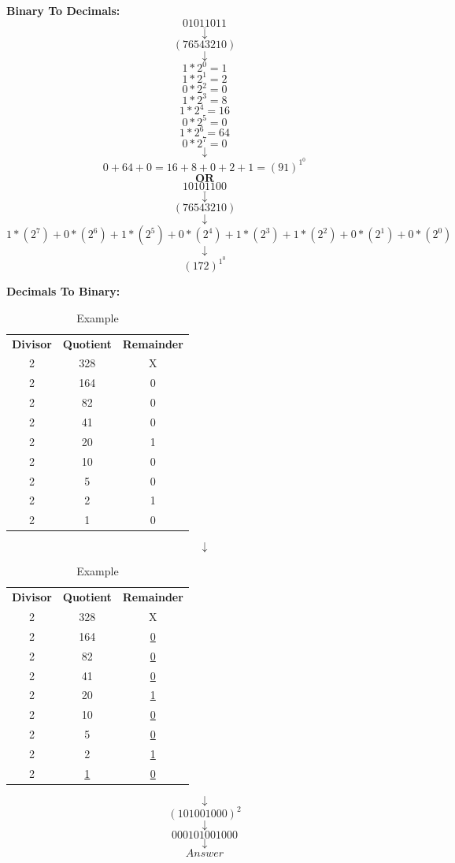 \documentclass{article}
\begin{document}
\newpage

\textbf{Binary To Decimals:}
\newline
$$\underline{01011011}$$
$$\downarrow$$
$$(76543210)$$
$$\downarrow$$
$$1*2^0=1$$
$$1*2^1=2$$
$$0*2^2=0$$
$$1*2^3=8$$
$$1*2^4=16$$
$$0*2^5=0$$
$$1*2^6=64$$
$$0*2^7=0$$
$$\downarrow$$
$$0+64+0=16+8+0+2+1=(91)^1^0$$
\newline
$$\textbf{OR}$$
\newline
$$\underline{10101100}$$
$$\downarrow$$
$$(76543210)$$
$$\downarrow$$
$$1*(2^7)+0*(2^6)+1*(2^5)+0*(2^4)+1*(2^3)+1*(2^2)+0*(2^1)+0*(2^0)$$
$$\downarrow$$
$$(172)^1^0$$

\newpage
\textbf{Decimals To Binary:}
\begin{table}[h!]
    \centering
    \begin{tabular}{|c|c|c|}
        \textbf{Divisor} & \textbf{Quotient} & \textbf{Remainder} \\
        2 & 328 & X \\
        2 & 164 & 0 \\
        2 & 82 & 0 \\
        2 & 41 & 0 \\
        2 & 20 & 1 \\
        2 & 10 & 0 \\
        2 & 5 & 0 \\
        2 & 2 & 1 \\
        2 & 1 & 0 \\
        
    \end{tabular}
    \caption{Example}
    \label{tab:my_label}
\end{table}
$$\downarrow$$
\begin{table}[h!]
    \centering
    \begin{tabular}{|c|c|c|}
        \textbf{Divisor} & \textbf{Quotient} & \textbf{Remainder} \\
        2 & 328 & X \\
        2 & 164 & \underline{0} \\
        2 & 82 & \underline{0} \\
        2 & 41 & \underline{0} \\
        2 & 20 & \underline{1} \\
        2 & 10 & \underline{0} \\
        2 & 5 & \underline{0} \\
        2 & 2 & \underline{1} \\
        2 & \underline{1} & \underline{0} \\
        
    \end{tabular}
    \caption{Example}
    \label{tab:my_label}
\end{table}
$$\downarrow$$
$$(101001000)^2$$
$$\downarrow$$
$$000101001000$$
$$\downarrow$$
$$Answer$$
\end{document}
